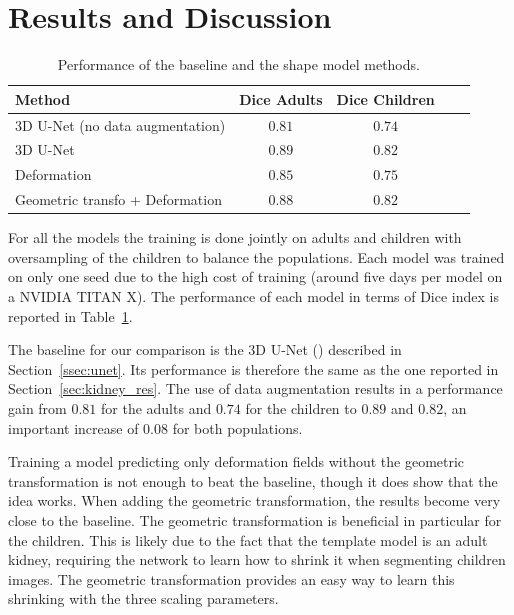 \section{Results and Discussion}
\label{sec:seg_result}

\begin{table}[htbp]
	\centering
\begin{tabular}{|l|c|c|c|c|}
	\hline
    Method & Dice Adults & Dice Children \\
	\hline
	3D U-Net (no data augmentation) & $0.81$ & $0.74$ \\
    3D U-Net & $\bm{0.89}$ & $\bm{0.82}$ \\
    Deformation & $0.85$ & $0.75$ \\
    Geometric transfo + Deformation & $0.88$ & $\bm{0.82}$ \\
    \hline
\end{tabular}
	\vspace{2mm}
	\caption{Performance of the baseline and the shape model methods.}
    \label{table:seg_results}
\end{table}

For all the models the training is done jointly on adults and children with oversampling of the children to balance the populations. Each model was trained on only one seed due to the high cost of training (around five days per model on a NVIDIA TITAN X). The performance of each model in terms of Dice index is reported in Table~\ref{table:seg_results}.

The baseline for our comparison is the 3D U-Net (\textcite{cicek2016MICCAI}) described in Section~\ref{ssec:unet}. Its performance is therefore the same as the one reported in Section~\ref{sec:kidney_res}. The use of data augmentation results in a performance gain from $0.81$ for the adults and $0.74$ for the children to $0.89$ and $0.82$, an important increase of $0.08$ for both populations. 

Training a model predicting only deformation fields without the geometric transformation is not enough to beat the baseline, though it does show that the idea works. When adding the geometric transformation, the results become very close to the baseline. The geometric transformation is beneficial in particular for the children. This is likely due to the fact that the template model is an adult kidney, requiring the network to learn how to shrink it when segmenting children images. The geometric transformation provides an easy way to learn this shrinking with the three scaling parameters.

